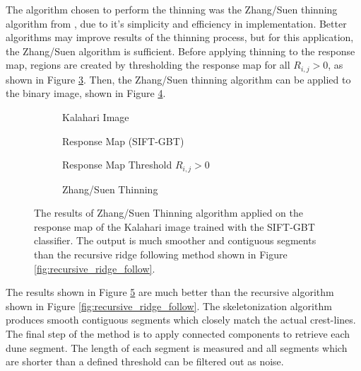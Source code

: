 The algorithm chosen to perform the thinning was the Zhang/Suen thinning algorithm from \cite{fast-parallel-algorithm-thinning}, due to it's simplicity and efficiency in implementation. Better algorithms may improve results of the thinning process, but for this application, the Zhang/Suen algorithm is sufficient. Before applying thinning to the response map, regions are created by thresholding the response map for all $R_{i,j} > 0$, as shown in Figure \ref{fig:thinning2_kalahari_threshold}. Then, the Zhang/Suen thinning algorithm can be applied to the binary image, shown in Figure \ref{fig:thinning2_kalahari}.

\begin{figure}
	\centering
	\begin{subfigure}{0.48\textwidth}
		\centering
		\caption{Kalahari Image}
		\label{fig:thinning2_kalahari_input}
	\end{subfigure}
	\begin{subfigure}{0.48\textwidth}
		\centering
		\caption{ Response Map (SIFT-GBT) }
		\label{fig:thinning2_kalahari_response}
	\end{subfigure}
	\begin{subfigure}{0.8\textwidth}
		\centering
		\caption{ Response Map Threshold $R_{i,j} > 0$ }
		\label{fig:thinning2_kalahari_threshold}
	\end{subfigure}
	\begin{subfigure}{0.8\textwidth}
		\centering
		\caption{ Zhang/Suen Thinning \cite{fast-parallel-algorithm-thinning} }
		\label{fig:thinning2_kalahari}
	\end{subfigure}
	\caption{The results of Zhang/Suen Thinning \cite{fast-parallel-algorithm-thinning} algorithm applied on the response map of the Kalahari image trained with the SIFT-GBT classifier. The output is much smoother and contiguous segments than the recursive ridge following method shown in Figure \ref{fig:recursive_ridge_follow}. }
	\label{fig:zhang_suen_results}
\end{figure}

The results shown in Figure \ref{fig:zhang_suen_results} are much better than the recursive algorithm shown in Figure \ref{fig:recursive_ridge_follow}. The skeletonization algorithm produces smooth contiguous segments which closely match the actual crest-lines. The final step of the method is to apply connected components to retrieve each dune segment. The length of each segment is measured and all segments which are shorter than a defined threshold can be filtered out as noise. 

